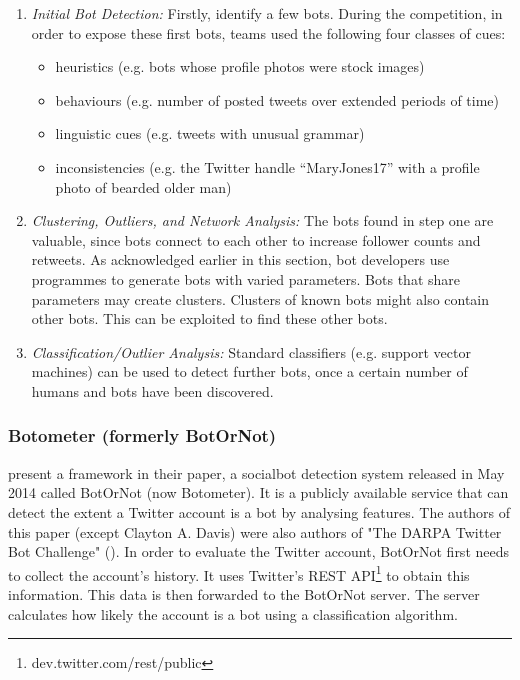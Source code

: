         \begin{enumerate}
            \item \textit{Initial Bot Detection:} Firstly, identify a few bots. During the competition, in order to expose these first bots, teams used the following four classes of cues:
                \begin{itemize}
                    \item heuristics (e.g. bots whose profile photos were stock images) 
                    \item behaviours (e.g. number of posted tweets over extended periods of time)
                    \item linguistic cues (e.g. tweets with unusual grammar)
                    \item inconsistencies (e.g. the Twitter handle “MaryJones17” with a profile photo of bearded older man)
                \end{itemize}
            \item \textit{Clustering, Outliers, and Network Analysis:} The bots found in step one are valuable, since bots connect to each other to increase follower counts and retweets. As acknowledged earlier in this section, bot developers use programmes to generate bots with varied parameters. Bots that share parameters may create clusters. Clusters of known bots might also contain other bots. This can be exploited to find these other bots.
            \item \textit{Classification/Outlier Analysis:} Standard classifiers (e.g. support vector machines) can be used to detect further bots, once a certain number of humans and bots have been discovered.
        \end{enumerate}
    
    
    
    
    
    
    
    \subsubsection{Botometer (formerly BotOrNot)}
    \label{subsubsection:Botometer}
    \textcite[273-274]{BotOrNotASystem} present a framework in their paper, a socialbot detection system released in May 2014 called BotOrNot (now Botometer). It is a publicly available service that can detect the extent a Twitter account is a bot by analysing features. The authors of this paper (except Clayton A. Davis) were also authors of "The DARPA Twitter Bot Challenge" (\textcite[]{theDarpaTwitterBotChallenge}). In order to evaluate the Twitter account, BotOrNot first needs to collect the account’s history. It uses Twitter’s REST API\footnote{dev.twitter.com/rest/public} to obtain this information. This data is then forwarded to the BotOrNot server. The server calculates how likely the account is a bot using a classification algorithm.
    
